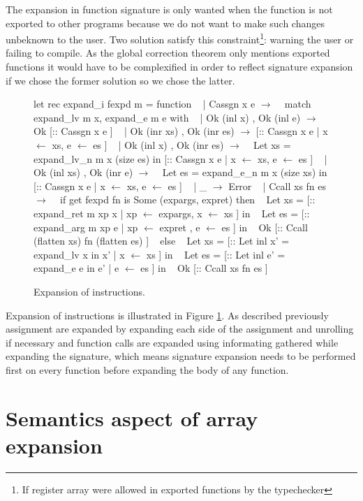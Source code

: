 \documentclass{article}
\begin{document}
\smallskip

The expansion in function signature is only wanted when the function is not
exported to other programs because we do not want to make such changes unbeknown
to the user. Two solution satisfy this constraint\footnote{If register array
were allowed in exported functions by the typechecker}: warning the user or
failing to compile. As the global correction theorem only mentions exported
functions it would have to be complexified in order to reflect signature
expansion if we chose the former solution so we chose the latter.

\medskip

\begin{figure}[t]
\obeylines\obeyspaces\ttfamily%
let rec expand\_i fexpd m = function
~ | Cassgn x e \(\rightarrow\)
~   match expand\_lv m x, expand\_e m e    with
~   | Ok (inl x)       , Ok (inl e)      \(\rightarrow\) Ok [:: Cassgn x e ]
~   | Ok (inr xs)      , Ok (inr es)     \(\rightarrow\) [:: Cassgn x e | x \(\leftarrow\) xs, e \(\leftarrow\) es ]
~   | Ok (inl x)       , Ok (inr es)     \(\rightarrow\)
~     Let xs = expand\_lv\_n m x (size es) in [:: Cassgn x e | x \(\leftarrow\) xs, e \(\leftarrow\) es ]
~   | Ok (inl xs)      , Ok (inr e)      \(\rightarrow\)
~     Let es = expand\_e\_n  m x (size xs) in [:: Cassgn x e | x \(\leftarrow\) xs, e \(\leftarrow\) es ]
~   | \_                                  \(\rightarrow\) Error
~ | Ccall xs fn es \(\rightarrow\)
~   if get fexpd fn is Some (expargs, expret) then
~     Let xs = [:: expand\_ret m xp x | xp \(\leftarrow\) expargs, x \(\leftarrow\) xs ] in
~     Let es = [:: expand\_arg m xp e | xp \(\leftarrow\) expret , e \(\leftarrow\) es ] in
~     Ok [:: Ccall (flatten xs) fn (flatten es) ]
~   else
~     Let xs = [:: Let inl x' = expand\_lv x in x' | x \(\leftarrow\) xs ] in
~     Let es = [:: Let inl e' = expand\_e e  in e' | e \(\leftarrow\) es ] in
~     Ok [:: Ccall xs fn es ]
\normalfont%
\caption{Expansion of instructions.}\label{fig:insexp}
\end{figure}

Expansion of instructions is illustrated in Figure \ref{fig:insexp}. As
described previously assignment are expanded by expanding each side of the
assignment and unrolling if necessary and function calls are expanded using
informating gathered while expanding the signature, which means signature
expansion needs to be performed first on every function before expanding the
body of any function.

\section{Semantics aspect of array expansion}\label{sec:semantics}
\end{document}
